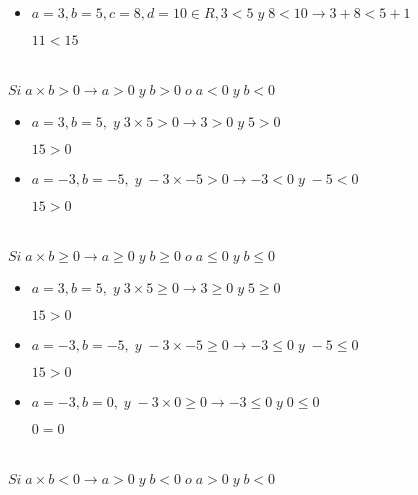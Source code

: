 \documentclass[12pt, letterpaper, twoside]{article}
\begin{document}
\begin{itemize}
    \item $a = 3, b = 5, c = 8, d = 10 \in R, 3 < 5 \;y\; 8 < 10 \to 3 + 8 < 5 + 1$
    
    $ 11 < 15$
\end{itemize}

\section{}

$Si \; a \times b > 0 \to a > 0 \;y\; b > 0 \; o \; a < 0 \;y\; b < 0$

\begin{itemize}
    \item $a = 3, b = 5, \;y\; 3 \times 5 > 0 \to 3 > 0 \;y\; 5 > 0$
    
    $15 > 0$

    \item $a = -3, b = -5, \;y\; -3 \times -5 > 0 \to -3 < 0 \;y\; -5 < 0$
    
    $15 > 0$
\end{itemize}

\section{}

$Si \; a \times b \geq 0 \to a \geq 0 \;y\; b \geq 0 \; o \; a  \leq  0 \;y\; b  \leq  0$

\begin{itemize}
    \item $a = 3, b = 5, \;y\; 3 \times 5 \geq 0 \to 3 \geq 0 \;y\; 5 \geq 0$
    
    $15 > 0$

    \item $a = -3, b = -5, \;y\; -3 \times -5 \geq 0 \to -3  \leq  0 \;y\; -5  \leq  0$
    
    $15 > 0$

    \item $a = -3, b = 0, \;y\; -3 \times 0 \geq 0 \to -3  \leq  0 \;y\; 0  \leq  0$
    
    $0 = 0$
\end{itemize}

\section{}

$Si \; a \times b < 0 \to a > 0 \;y\; b < 0 \; o \; a > 0 \;y\; b < 0$
\end{document}
